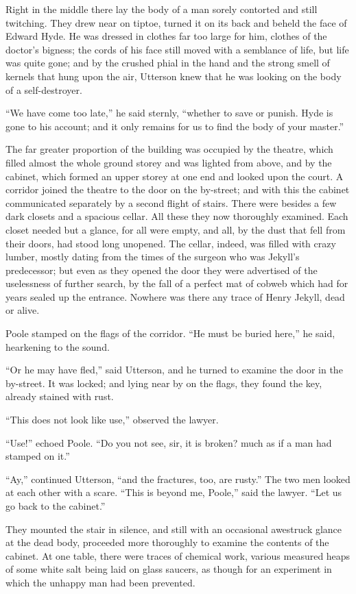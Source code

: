 \documentclass[12pt,openright]{book}
\begin{document}
Right in the middle there lay the body of a man sorely contorted and still twitching. They drew near on tiptoe, turned it on its back and beheld the face of Edward Hyde. He was dressed in clothes far too large for him, clothes of the doctor’s bigness; the cords of his face still moved with a semblance of life, but life was quite gone; and by the crushed phial in the hand and the strong smell of kernels that hung upon the air, Utterson knew that he was looking on the body of a self-destroyer.

“We have come too late,” he said sternly, “whether to save or punish. Hyde is gone to his account; and it only remains for us to find the body of your master.”

The far greater proportion of the building was occupied by the theatre, which filled almost the whole ground storey and was lighted from above, and by the cabinet, which formed an upper storey at one end and looked upon the court. A corridor joined the theatre to the door on the by-street; and with this the cabinet communicated separately by a second flight of stairs. There were besides a few dark closets and a spacious cellar. All these they now thoroughly examined. Each closet needed but a glance, for all were empty, and all, by the dust that fell from their doors, had stood long unopened. The cellar, indeed, was filled with crazy lumber, mostly dating from the times of the surgeon who was Jekyll’s predecessor; but even as they opened the door they were advertised of the uselessness of further search, by the fall of a perfect mat of cobweb which had for years sealed up the entrance. Nowhere was there any trace of Henry Jekyll, dead or alive.

Poole stamped on the flags of the corridor. “He must be buried here,” he said, hearkening to the sound.

“Or he may have fled,” said Utterson, and he turned to examine the door in the by-street. It was locked; and lying near by on the flags, they found the key, already stained with rust.

“This does not look like use,” observed the lawyer.

“Use!” echoed Poole. “Do you not see, sir, it is broken? much as if a man had stamped on it.”

“Ay,” continued Utterson, “and the fractures, too, are rusty.” The two men looked at each other with a scare. “This is beyond me, Poole,” said the lawyer. “Let us go back to the cabinet.”

They mounted the stair in silence, and still with an occasional awestruck glance at the dead body, proceeded more thoroughly to examine the contents of the cabinet. At one table, there were traces of chemical work, various measured heaps of some white salt being laid on glass saucers, as though for an experiment in which the unhappy man had been prevented.
\end{document}
